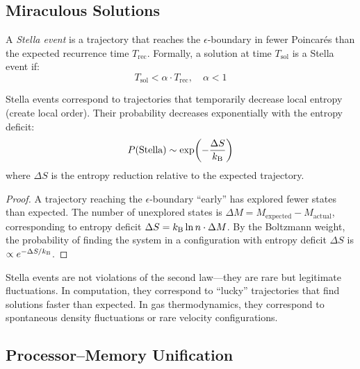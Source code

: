 \subsection{Miraculous Solutions}

\begin{definition}
\label{def:stella}
A \emph{Stella event} is a trajectory that reaches the $\epsilon$-boundary in fewer Poincar\'{e}s than the expected recurrence time $T_{\mathrm{rec}}$. Formally, a solution at time $T_{\mathrm{sol}}$ is a Stella event if:
\begin{equation}
    T_{\mathrm{sol}} < \alpha \cdot T_{\mathrm{rec}}, \quad \alpha < 1
\end{equation}
\end{definition}

\begin{theorem}
\label{thm:stella}
Stella events correspond to trajectories that temporarily decrease local entropy (create local order). Their probability decreases exponentially with the entropy deficit:
\begin{equation}
    P(\text{Stella}) \sim \exp\!\left(-\frac{\Delta S}{k_{\mathrm{B}}}\right)
\end{equation}
where $\Delta S$ is the entropy reduction relative to the expected trajectory.
\end{theorem}

\begin{proof}
A trajectory reaching the $\epsilon$-boundary ``early'' has explored fewer states than expected. The number of unexplored states is $\Delta M = M_{\mathrm{expected}} - M_{\mathrm{actual}}$, corresponding to entropy deficit $\Delta S = k_{\mathrm{B}} \ln n \cdot \Delta M$. By the Boltzmann weight, the probability of finding the system in a configuration with entropy deficit $\Delta S$ is $\propto e^{-\Delta S/k_{\mathrm{B}}}$.
\end{proof}

\begin{remark}
Stella events are not violations of the second law---they are rare but legitimate fluctuations. In computation, they correspond to ``lucky'' trajectories that find solutions faster than expected. In gas thermodynamics, they correspond to spontaneous density fluctuations or rare velocity configurations.
\end{remark}

\subsection{Processor--Memory Unification}

